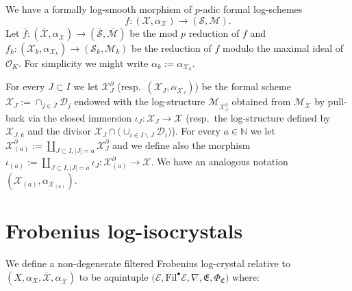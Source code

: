 \documentclass[asterisque,english]{smfart}
\begin{document}
We have a formally log-smooth morphism of $p$-adic formal log-schemes $$f\colon (\mathcal{X},\alpha_\mathcal{X}) \longrightarrow (\mathcal{S},\mathcal{M}).$$Let $\overline{f}\colon (\overline{\mathcal{X}},\alpha_{\overline{\mathcal{X}}}) \longrightarrow (\overline{\mathcal{S}},\overline{\mathcal{M}}) $ be the mod $p$ reduction of $f$ and $f_k\colon (\mathcal{X}_k,\alpha_{\mathcal{X}_k}) \longrightarrow (\mathcal{S}_k,\mathcal{M}_k)$ be the reduction of $f$ modulo the maximal ideal of $\mathcal{O}_K$. For simplicity we might write $\alpha_k:=\alpha_{\mathcal{X}_k}$.



For every $J\subset I$ we let $\mathcal{X}_J^\partial$ (resp.~$(\mathcal{X}_J,\alpha_{\mathcal{X}_J})$) be the formal scheme $\mathcal{X}_J:=\cap_{j\in J} \mathcal{D}_j$ endowed with the log-structure $\mathcal{M}_{\mathcal{X}_J^\partial} $ obtained from $\mathcal{M}_{\mathcal{X}}$ by pull-back via the closed immersion $\iota_J\colon \mathcal{X}_J\to \mathcal{X}$ (resp.~the log-structure defined by $\mathcal{X}_{J,k}$ and the divisor $\mathcal{X}_J\cap \bigl(\cup_{i\in I\backslash J} \mathcal{D}_i\bigr)$). For every $a\in \mathbb{N}$ we let $\mathcal{X}_{(a)}^\partial:=\amalg_{J\subset I, \vert J\vert=a} \mathcal{X}_J^\partial$  and we define also the morphism $\iota_{(a)}:=\amalg_{J\subset I, \vert J\vert=a} \iota_J\colon \mathcal{X}_{(a)}^\partial\to \mathcal{X}$. We have an analogous notation  $(\mathcal{X}_{(a)},\alpha_{\mathcal{X}_{(a)}})$.




\section{Frobenius log-isocrystals}\label{sec:FrobIso}


We define a non-degenerate filtered Frobenius log-crystal relative to $(X,\alpha_X,\overline{\mathcal{X}},\alpha_{\overline{\mathcal{X}}})$ to be aquintuple  $ \bigl(\mathcal{E},\mathrm{Fil}^\bullet \mathcal{E}, \nabla,\mathfrak{E},\Phi_{\mathfrak{E}}\bigr)$ where:
\end{document}
